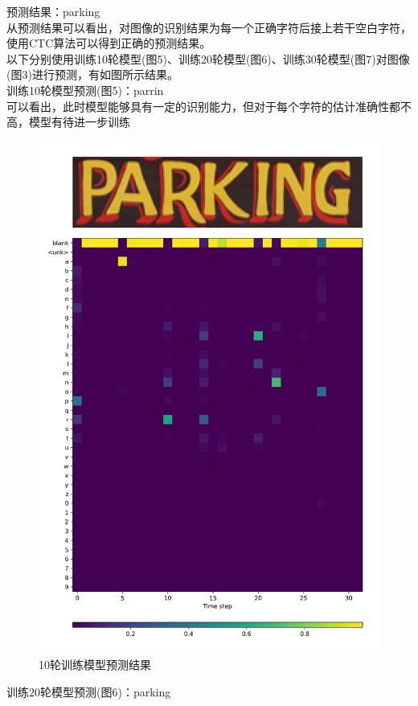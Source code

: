 \documentclass[a4paper]{article}
\begin{document}
预测结果：parking\\
从预测结果可以看出，对图像的识别结果为每一个正确字符后接上若干空白字符，使用CTC算法可以得到正确的预测结果。\\
以下分别使用训练10轮模型(图5)、训练20轮模型(图6)、训练30轮模型(图7)对图像(图3)进行预测，有如图所示结果。\\
训练10轮模型预测(图5)：parrin \\
可以看出，此时模型能够具有一定的识别能力，但对于每个字符的估计准确性都不高，模型有待进一步训练 \\
\begin{figure}
    \centering
    \includegraphics[width=12cm]{Fig_5.jpg}
    \caption{10轮训练模型预测结果}
\end{figure}
训练20轮模型预测(图6)：parking \\
\end{document}
